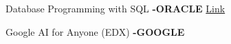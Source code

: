 \documentclass[]{deedy-resume-openfont}
\begin{document}
\begin{minipage}[t]{0.66\textwidth}
\subsection{}

\begin{tightemize}

\item Database Programming with SQL \textbf{-ORACLE} \href{}{Link}
\item Google AI for Anyone 
 (EDX) \textbf{-GOOGLE}
 
 
\end{tightemize}
\sectionsep



\nocite{*}

\end{minipage} 
\end{document}
